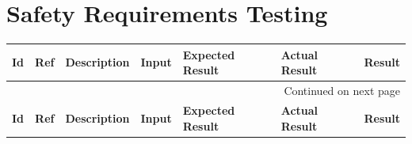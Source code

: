 \documentclass[12pt, titlepage]{article}
\begin{document}
\section{Safety Requirements Testing}

\begin{longtable}{|p{1.4cm}|p{1.1cm}|p{2.5cm}|p{1.5cm}|p{2.2cm}|p{1.9cm}|p{1.2cm}|}

  \endfirsthead
  \hline
  \textbf{Id} & \textbf{Ref} & \textbf{Description}                                                         & \textbf{Input}                                    & \textbf{Expected Result}                                    & \textbf{Actual Result} & \textbf{Result}                                    \\ \hline

  \endhead

  \hline \multicolumn{7}{|r|}{Continued on next page} \\ \hline
  \endfoot
   
  \endlastfoot
  \hline
  \textbf{Id} & \textbf{Ref} & \textbf{Description}                                                         & \textbf{Input}                                    & \textbf{Expected Result}                                    & \textbf{Actual Result} & \textbf{Result}                                    \\ \hline


\end{longtable}
\end{document}
